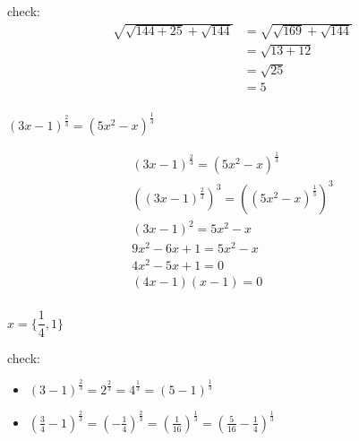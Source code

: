 \documentclass[fleqn,addpoints]{exam}
\begin{document}
\begin{questions}
\begin{solution}[9 cm]
check: 
\begin{align*}
  \sqrt{ \sqrt{144+25} + \sqrt{144}} &= \sqrt{ \sqrt{169} + \sqrt{144}} \\
  &= \sqrt{13 + 12} \\
  &= \sqrt{25} \\
  &= 5 \\
\end{align*}

\end{solution}

\question[7]
\label{extra:last} \( (3x-1)^{\frac{2}{3}} = (5x^2 - x)^{\frac{1}{3}} \) 
\begin{solution}[7 cm]
\begin{align*}
  (3x-1)^{\frac{2}{3}} = (5x^2 - x)^{\frac{1}{3}} \\
  ((3x-1)^{\frac{2}{3}})^3 = ((5x^2 - x)^{\frac{1}{3}})^3 \\
  (3x-1)^2 = 5x^2 - x \\
  9x^2-6x+1 = 5x^2 - x \\
  4x^2-5x+1 = 0 \\
  (4x-1)(x-1) = 0 \\
\end{align*}

$x = \{ \dfrac{1}{4}, 1 \}$

check:
\begin{itemize}
  \item \( (3-1)^{\frac{2}{3}} = 2^{\frac{2}{3}} = 4^{\frac{1}{3}} = (5 - 1)^{\frac{1}{3}} \)
  \item \( \displaystyle \left( \frac{3}{4}-1 \right)^{\frac{2}{3}} = \left(- \frac{1}{4} \right)^{\frac{2}{3}} 
    = \left( \frac{1}{16} \right)^{\frac{1}{3}} = \left(\frac{5}{16} - \frac{1}{4} \right)^{\frac{1}{3}}\)
\end{itemize}

\end{solution}

\end{questions}
\end{document}

